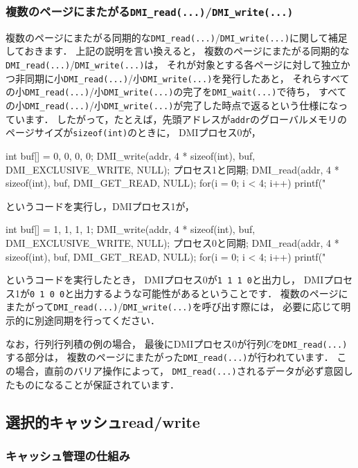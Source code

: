 \documentclass[report,12pt]{jsbook}
\begin{document}
\subsubsection{複数のページにまたがる\texttt{DMI\_read(...)}/\texttt{DMI\_write(...)}}

複数のページにまたがる同期的な\texttt{DMI\_read(...)}/\texttt{DMI\_write(...)}に関して補足しておきます．
上記の説明を言い換えると，
複数のページにまたがる同期的な\texttt{DMI\_read(...)}/\texttt{DMI\_write(...)}は，
それが対象とする各ページに対して独立かつ非同期に小\texttt{DMI\_read(...)}/小\texttt{DMI\_write(...)}を発行したあと，
それらすべての小\texttt{DMI\_read(...)}/小\texttt{DMI\_write(...)}の完了を\texttt{DMI\_wait(...)}で待ち，
すべての小\texttt{DMI\_read(...)}/小\texttt{DMI\_write(...)}が完了した時点で返るという仕様になっています．
したがって，たとえば，先頭アドレスが\texttt{addr}のグローバルメモリのページサイズが\texttt{sizeof(int)}のときに，
DMIプロセス0が，
\begin{code}
int buf[] = {0, 0, 0, 0};
DMI_write(addr, 4 * sizeof(int), buf, DMI_EXCLUSIVE_WRITE, NULL);
プロセス1と同期;
DMI_read(addr, 4 * sizeof(int), buf, DMI_GET_READ, NULL);
for(i = 0; i < 4; i++)
  {
    printf("%
  }
\end{code}
というコードを実行し，DMIプロセス1が，
\begin{code}
int buf[] = {1, 1, 1, 1};
DMI_write(addr, 4 * sizeof(int), buf, DMI_EXCLUSIVE_WRITE, NULL);
プロセス0と同期;
DMI_read(addr, 4 * sizeof(int), buf, DMI_GET_READ, NULL);
for(i = 0; i < 4; i++)
  {
    printf("%
  }
\end{code}
というコードを実行したとき，
DMIプロセス0が\texttt{1 1 1 0}と出力し，
DMIプロセス1が\texttt{0 1 0 0}と出力するような可能性があるということです．
複数のページにまたがって\texttt{DMI\_read(...)}/\texttt{DMI\_write(...)}を呼び出す際には，
必要に応じて明示的に別途同期を行ってください．

なお，行列行列積の例の場合，
最後にDMIプロセス0が行列$C$を\texttt{DMI\_read(...)}する部分は，
複数のページにまたがった\texttt{DMI\_read(...)}が行われています．
この場合，直前のバリア操作によって，
\texttt{DMI\_read(...)}されるデータが必ず意図したものになることが保証されています．

\subsection{選択的キャッシュread/write}

\subsubsection{キャッシュ管理の仕組み}
\end{document}
